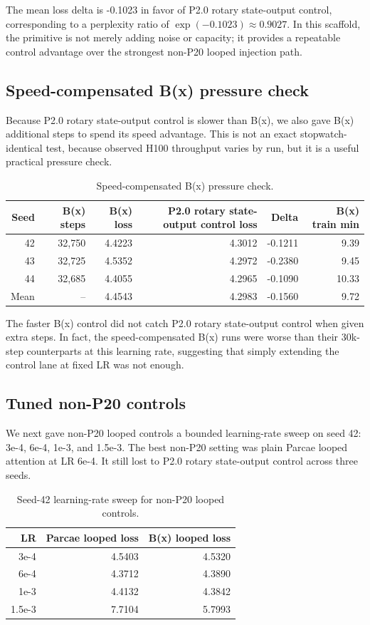 \documentclass[11pt]{article}
\newcommand{\pshort}{P20}
\newcommand{\pcontrol}{P2.0 rotary state-output control}
\newcommand{\parcae}{Parcae}
\newcommand{\bx}{B(x)}
\begin{document}
The mean loss delta is -0.1023 in favor of \pcontrol{}, corresponding to a
perplexity ratio of $\exp(-0.1023) \approx 0.9027$. In this scaffold, the
primitive is not merely adding noise or capacity; it provides a repeatable
control advantage over the strongest non-\pshort{} looped injection path.

\subsection{Speed-compensated \bx{} pressure check}

Because \pcontrol{} is slower than \bx{}, we also gave \bx{} additional steps
to spend its speed advantage. This is not an exact stopwatch-identical test,
because observed H100 throughput varies by run, but it is a useful practical
pressure check.

\begin{table}[h]
\centering
\caption{Speed-compensated \bx{} pressure check.}
\label{tab:bxspeed}
\begin{tabular}{rrrrrr}
\toprule
Seed & \bx{} steps & \bx{} loss & \pcontrol{} loss & Delta & \bx{} train min \\
\midrule
42 & 32,750 & 4.4223 & 4.3012 & -0.1211 & 9.39 \\
43 & 32,725 & 4.5352 & 4.2972 & -0.2380 & 9.45 \\
44 & 32,685 & 4.4055 & 4.2965 & -0.1090 & 10.33 \\
\midrule
Mean & -- & 4.4543 & 4.2983 & -0.1560 & 9.72 \\
\bottomrule
\end{tabular}
\end{table}

The faster \bx{} control did not catch \pcontrol{} when given extra steps. In
fact, the speed-compensated \bx{} runs were worse than their 30k-step
counterparts at this learning rate, suggesting that simply extending the
control lane at fixed LR was not enough.

\subsection{Tuned non-\pshort{} controls}

We next gave non-\pshort{} looped controls a bounded learning-rate sweep on seed 42:
3e-4, 6e-4, 1e-3, and 1.5e-3. The best non-\pshort{} setting was plain \parcae{}
looped attention at LR 6e-4. It still lost to \pcontrol{} across three seeds.

\begin{table}[h]
\centering
\caption{Seed-42 learning-rate sweep for non-\pshort{} looped controls.}
\label{tab:lrsweep}
\begin{tabular}{rrr}
\toprule
LR & \parcae{} looped loss & \bx{} looped loss \\
\midrule
3e-4 & 4.5403 & 4.5320 \\
6e-4 & 4.3712 & 4.3890 \\
1e-3 & 4.4132 & 4.3842 \\
1.5e-3 & 7.7104 & 5.7993 \\
\bottomrule
\end{tabular}
\end{table}
\end{document}

